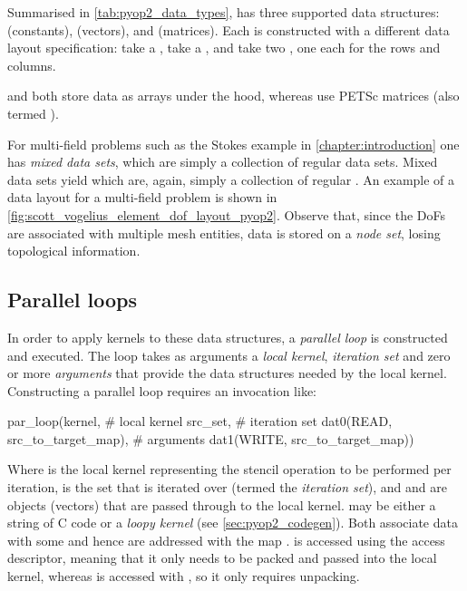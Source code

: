\documentclass[thesis]{subfiles}
\begin{document}
Summarised in \cref{tab:pyop2_data_types},  has three supported data structures:  (constants),  (vectors), and  (matrices).
Each is constructed with a different data layout specification:  take a ,  take a , and  take two , one each for the rows and columns.

 and  both store data as \numpy arrays under the hood, whereas  use PETSc matrices (also termed ).

For multi-field problems such as the Stokes example in \cref{chapter:introduction} one has \textit{mixed data sets}, which are simply a collection of regular data sets.
Mixed data sets yield  which are, again, simply a collection of regular .
An example of a  data layout for a multi-field problem is shown in \cref{fig:scott_vogelius_element_dof_layout_pyop2}.
Observe that, since the DoFs are associated with multiple mesh entities, data is stored on a \emph{node set}, losing topological information.

\subsection{Parallel loops}
\label{sec:pyop2_parallel}

In order to apply kernels to these data structures, a \textit{parallel loop} is constructed and executed.
The loop takes as arguments a \textit{local kernel}, \textit{iteration set} and zero or more \textit{arguments} that provide the data structures needed by the local kernel.
Constructing a parallel loop requires an invocation like:
\begin{pyinline}
  par_loop(kernel,                          # local kernel
           src_set,                         # iteration set
           dat0(READ, src_to_target_map),   # arguments
           dat1(WRITE, src_to_target_map))
\end{pyinline}
Where  is the local kernel representing the stencil operation to be performed per iteration,  is the set that is iterated over (termed the \emph{iteration set}), and  and  are  objects (vectors) that are passed through to the local kernel.
 may be either a string of C code or a \emph{loopy kernel} (see \cref{sec:pyop2_codegen}).
Both  associate data with some  and hence are addressed with the map .
 is accessed using the  access descriptor, meaning that it only needs to be packed and passed into the local kernel, whereas  is accessed with , so it only requires unpacking.
\end{document}
